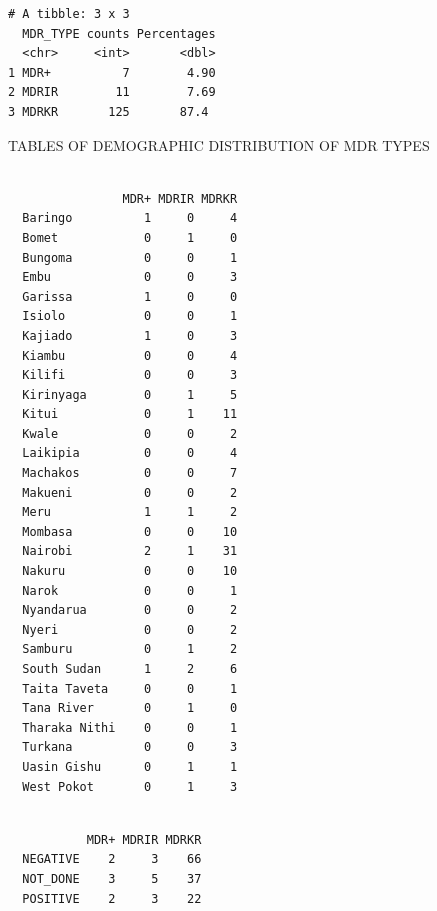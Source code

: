 \documentclass[
]{report}
\newenvironment{Shaded}{\begin{snugshade}}{\end{snugshade}}
\newcommand{\FunctionTok}[1]{\textcolor[rgb]{0.28,0.35,0.67}{#1}}
\newcommand{\NormalTok}[1]{\textcolor[rgb]{0.00,0.23,0.31}{#1}}
\newcommand{\SpecialCharTok}[1]{\textcolor[rgb]{0.37,0.37,0.37}{#1}}
\begin{document}
\begin{verbatim}
# A tibble: 3 x 3
  MDR_TYPE counts Percentages
  <chr>     <int>       <dbl>
1 MDR+          7        4.90
2 MDRIR        11        7.69
3 MDRKR       125       87.4 
\end{verbatim}

TABLES OF DEMOGRAPHIC DISTRIBUTION OF MDR TYPES

\begin{Shaded}
\end{Shaded}

\begin{verbatim}
               
                MDR+ MDRIR MDRKR
  Baringo          1     0     4
  Bomet            0     1     0
  Bungoma          0     0     1
  Embu             0     0     3
  Garissa          1     0     0
  Isiolo           0     0     1
  Kajiado          1     0     3
  Kiambu           0     0     4
  Kilifi           0     0     3
  Kirinyaga        0     1     5
  Kitui            0     1    11
  Kwale            0     0     2
  Laikipia         0     0     4
  Machakos         0     0     7
  Makueni          0     0     2
  Meru             1     1     2
  Mombasa          0     0    10
  Nairobi          2     1    31
  Nakuru           0     0    10
  Narok            0     0     1
  Nyandarua        0     0     2
  Nyeri            0     0     2
  Samburu          0     1     2
  South Sudan      1     2     6
  Taita Taveta     0     0     1
  Tana River       0     1     0
  Tharaka Nithi    0     0     1
  Turkana          0     0     3
  Uasin Gishu      0     1     1
  West Pokot       0     1     3
\end{verbatim}

\begin{Shaded}
\end{Shaded}

\begin{verbatim}
          
           MDR+ MDRIR MDRKR
  NEGATIVE    2     3    66
  NOT_DONE    3     5    37
  POSITIVE    2     3    22
\end{verbatim}
\end{document}

